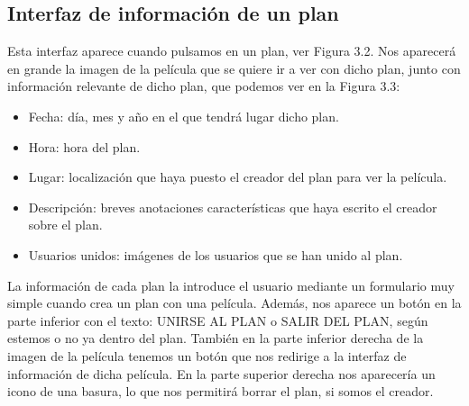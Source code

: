 \subsection{Interfaz de información de un plan}
\label{makereference3.4.3}
Esta interfaz aparece cuando pulsamos en un plan, ver Figura 3.2. Nos aparecerá en grande la imagen de la película que se quiere ir a ver con dicho plan, junto con información
relevante de dicho plan, que podemos ver en la Figura 3.3:
\begin{itemize}
    \item Fecha: día, mes y año en el que tendrá lugar dicho plan.
    \item Hora: hora del plan.
    \item Lugar: localización que haya puesto el creador del plan para ver la película.
    \item Descripción: breves anotaciones características que haya escrito el creador sobre el plan.
    \item Usuarios unidos: imágenes de los usuarios que se han unido al plan.
\end{itemize}
La información de cada plan la introduce el usuario mediante un formulario muy simple cuando crea un plan con una película.
Además, nos aparece un botón en la parte inferior con el texto: UNIRSE AL PLAN o SALIR DEL PLAN, según estemos o no ya dentro del plan.
También en la parte inferior derecha de la imagen de la película tenemos un botón que nos redirige a la interfaz de información de dicha película.
En la parte superior derecha nos aparecería un icono de una basura, lo que nos permitirá borrar el plan, si somos el creador.

